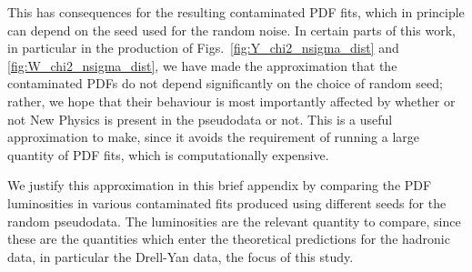 \documentclass[withindex,glossary]{cam-thesis}
\begin{document}
This has consequences for the resulting contaminated PDF fits, which in principle can depend on the seed used for the random noise. In certain parts of this work, in particular in the production of Figs.~\ref{fig:Y_chi2_nsigma_dist} and \ref{fig:W_chi2_nsigma_dist}, we have made the approximation that the contaminated PDFs do not depend significantly on the choice of random seed; rather, we hope that their behaviour is most importantly affected by whether or not New Physics is present in the pseudodata or not. This is a useful approximation to make, since it avoids the requirement of running a large quantity of PDF fits, which is computationally expensive.

We justify this approximation in this brief appendix by comparing the PDF luminosities in various contaminated fits produced using different seeds for the random pseudodata. The luminosities are the relevant quantity to compare, since these are the quantities which enter the theoretical predictions for the hadronic data, in particular the Drell-Yan data, the focus of this study.
\end{document}
